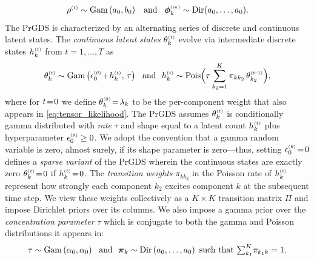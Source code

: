 \documentclass{article}
\begin{document}
\begin{equation}
\rhot \sim \Gam{a_0, b_0} \,\,\,\textrm{ and }\,\,\, \boldsymbol{\phi}^{\mathsmaller{(m)}}_k \sim \textrm{Dir}(a_0,\dots,a_0).
\end{equation}
The PrGDS is characterized by an alternating series of discrete and continuous latent states. The \emph{continuous latent states} $\thetakt$ evolve via intermediate discrete states $\hkt$ from $t=1,\dots,T$ as~
\begin{equation}
\label{eq:thetaktandhkt}
\thetakt \sim \Gam{\epstheta \tp \hkt,\, \tau} \,\,\textrm{ and }\,\, \hkt \sim \textrm{Pois}\Big(\tau \sum_{k_2 = 1}^K \pi_{kk_2} \,\thetakttm\Big),
\end{equation}
where for $t\!=\! 0$ we define $\theta^{\mathsmaller{(0)}}_k \teq \lambda_k$ to be the per-component weight that also appears in \cref{eq:tensor_likelihood}. The PrGDS assumes $\thetakt$ is conditionally gamma distributed with \emph{rate} $\tau$ and shape equal to a latent count $\hkt$ plus hyperparameter $\epstheta \geq 0$. We adopt the convention that a gamma random variable is zero, almost surely, if its shape parameter is zero---thus, setting $\epstheta \teq 0$ defines a \emph{sparse variant} of the PrGDS wherein the continuous states are exactly zero $\thetakt \teq 0$ if $\hkt \teq 0$. The \emph{transition weights} $\pi_{kk_2}$ in the Poisson rate of $\hkt$ represent how strongly each component $k_2$ excites component $k$ at the subsequent time step. We view these weights collectively as a $K \!\times\! K$ transition matrix $\Pi$ and impose Dirichlet priors over its columns. We also impose a gamma prior over the \emph{concentration parameter} $\tau$ which is conjugate to both the gamma and Poisson distributions it appears in:~
\begin{equation}
\tau \sim \Gam{\alpha_0, \alpha_0} \,\,\textrm{ and }\,\,
\boldsymbol{\pi}_k \sim \textrm{Dir}\left(a_0,\dots,a_0\right) \textrm{ such that }\mathsmaller{\sum_{k_1}}^K \pi_{k_1k}=1.
\end{equation}
\end{document}
